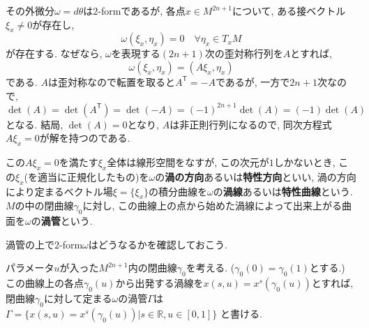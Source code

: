 \documentclass[a4paper]{ujarticle}
\numberwithin{equation}{section}
\theoremstyle{definition}
\begin{document}
    その外微分$\omega = d \theta$は$2$-formであるが, 
    各点$x \in M^{2n + 1}$について, ある接ベクトル$\xi_x \neq 0$が存在し,
    \[
        \omega(\xi_x, \eta_x) = 0 \quad \forall \eta_x \in T_x M
    \]
    が存在する.
    なぜなら, $\omega$を表現する$(2n + 1)$次の歪対称行列を$A$とすれば, 
    \[
        \omega(\xi_x, \eta_x) = (A \xi_x, \eta_x)
    \]
    である. $A$は歪対称なので転置を取ると$A^{\textsf{T}} = -A$であるが,
    一方で$2n + 1$次なので, 
    \[
        \det(A) = \det(A^{\textsf{T}}) = \det(-A) = (-1)^{2n + 1} \det(A) = (-1) \det(A)
    \]
    となる. 結局, $\det(A) = 0$となり, $A$は非正則行列になるので, 
    同次方程式$A \xi_x = 0$が解を持つのである.

    この$A \xi_x = 0$を満たす$\xi_x$全体は線形空間をなすが, この次元が$1$しかないとき, 
    この$\xi_x$(を適当に正規化したもの)を$\omega$の\textbf{渦の方向}あるいは\textbf{特性方向}といい,
    渦の方向により定まるベクトル場$\xi = \{\xi_x\}$の積分曲線を$\omega$の\textbf{渦線}あるいは\textbf{特性曲線}という.
    $M$の中の閉曲線$\gamma_0$に対し, この曲線上の点から始めた渦線によって出来上がる曲面を$\omega$の\textbf{渦管}という.

    渦管の上で2-form$\omega$はどうなるかを確認しておこう.

    パラメータ$u$が入った$M^{2n + 1}$内の閉曲線$\gamma_0$を考える. ($\gamma_0(0) = \gamma_0(1)$とする.)
    この曲線上の各点$\gamma_0(u)$から出発する渦線を$x(s, u) = x^{s}(\gamma_0(u))$とすれば,
    閉曲線$\gamma_0$に対して定まる$\omega$の渦管$\Gamma$は
    $\Gamma = \{x(s, u) = x^{s}(\gamma_0(u))| s \in \mathbb{R}, u \in [0,1]\}$
    と書ける.
\end{document}
